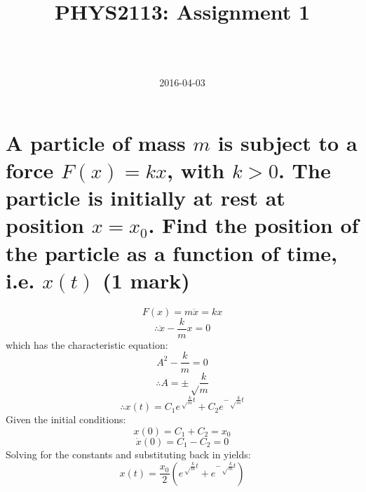 \documentclass[a4paper]{scrartcl}
\begin{document}
\title{PHYS2113: Assignment 1}
\author{ \\ \\ }
\date{2016-04-03}
\maketitle

\section{A particle of mass \(m\) is subject to a force \(F(x) = k x\), with \(k > 0\). The particle is initially at rest at position \(x = x_0\). Find the position of the particle as a function of time, i.e. \(x(t)\) (1 mark)}
\[F(x) = m \ddot{x} = k x\]
\[\therefore \ddot{x} - \frac{k}{m} x = 0\]
which has the characteristic equation:
\[A^2 - \frac{k}{m} = 0\]
\[\therefore A = \pm\sqrt\frac{k}{m}\]
\[\therefore x(t) = C_1 e^{\sqrt\frac{k}{m} t} + C_2 e^{-\sqrt\frac{k}{m} t}\]
Given the initial conditions:
\[x(0) = C_1 + C_2 = x_0\]
\[\dot{x}(0) = C_1 - C_2 = 0\]
Solving for the constants and substituting back in yields:
\[x(t) = \frac{x_0}{2} \left(e^{\sqrt\frac{k}{m} t} + e^{-\sqrt\frac{k}{m} t}\right)\]
\end{document}
